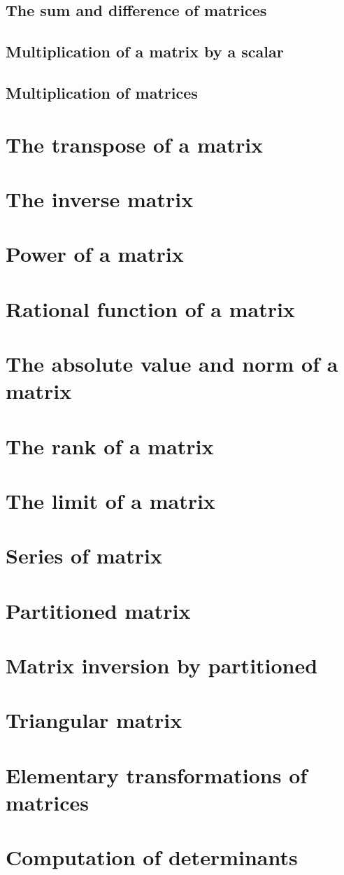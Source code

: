 \documentclass[13pt]{book}
\begin{document}
\subsection{The sum and difference of matrices}
\subsection{Multiplication of a matrix by a scalar}
\subsection{Multiplication of matrices}
\section{The transpose of a matrix}
\section{The inverse matrix}
\section{Power of a matrix}
\section{Rational function of a matrix}
\section{The absolute value and norm of a matrix}
\section{The rank of a matrix}
\section{The limit of a matrix}
\section{Series of matrix}
\section{Partitioned matrix}
\section{Matrix inversion by partitioned}
\section{Triangular matrix}
\section{Elementary transformations of matrices}
\section{Computation of determinants}
\end{document}
